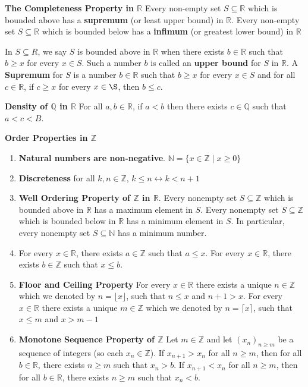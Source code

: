 

\begin{thm}\textbf{The Completeness Property in $\mathbb{R}$}
Every non-empty set $S\subseteq \mathbb{R}$ which is bounded above has a \textbf{supremum} (or least upper bound) in $\mathbb{R}$. Every non-empty set $S\subseteq \mathbb{R}$ which is bounded below has a \textbf{infimum} (or greatest lower bound) in $\mathbb{R}$

In $S \subseteq R$, we say $S$ is bounded above in $\mathbb{R}$ when there exists $b\in \mathbb{R}$ such that $b\geq x$ for every $x\in S$. Such a number $b$ is called an \textbf{upper bound} for $S$ in $\mathbb{R}$. A \textbf{Supremum} for $S$ is a number $b\in \mathbb{R}$ such that $b\geq x$ for every $x\in S$ and for all $c\in \mathbb{R}$, if $c\geq x$ for every $x\in \S$, then $b\leq c$.
\end{thm}

\begin{thm}
\textbf{Density of $\mathbb{Q}$ in $\mathbb{R}$} For all $a,b\in\mathbb{R}$, if $a<b$ then there exists $c\in \mathbb{Q}$ such that $a<c<B$.
\end{thm}

\begin{thm}\textbf{Order Properties in $\mathbb{Z}$}
\begin{enumerate}
    \item \textbf{Natural numbers are non-negative}. $\mathbb{N} = \{x\in \mathbb{Z} \mid x\geq 0\}$
    \item \textbf{Discreteness} for all $k,n\in \mathbb{Z}$, $k\leq n \leftrightarrow k<n+1$
    \item \textbf{Well Ordering Property of $\mathbb{Z}$ in $\mathbb{R}$}. Every nonempty set $S\subseteq \mathbb{Z}$ which is bounded above in $\mathbb{R}$ has a maximum element in $S$. Every nonempty set $S\subseteq \mathbb{Z}$ which is bounded below in $\mathbb{R}$ has a minimum element in $S$. In particular, every nonempty set $S\subseteq \mathbb{N}$ has a minimum number.
    \item For every $x\in \mathbb{R}$, there exists $a\in \mathbb{Z}$ such that $a\leq x$. For every $x\in \mathbb{R}$, there exists $b\in \mathbb{Z}$ such that $x\leq b$.
    \item \textbf{Floor and Ceiling Property} For every $x\in\mathbb{R}$ there exists a unique $n\in\mathbb{Z}$ which we denoted by $n=\lfloor x\rfloor$, such that $n\leq x$ and $n+1 >x$. For every $x\in\mathbb{R}$ there exists a unique $m\in\mathbb{Z}$ which we denoted by $n=\lceil x\rceil$, such that $x\leq m$ and $x > m-1$
    \item \textbf{Monotone Sequence Property of $\mathbb{Z}$} Let $m\in\mathbb{Z}$ and let $(x_n)_{n\geq m}$ be a sequence of integers (so each $x_n\in\mathbb{Z}$). If $x_{n+1} > x_n$ for all $n\geq m$, then for all $b\in \mathbb{R}$, there exists $n\geq m$ such that $x_n > b$. If $x_{n+1} < x_n$ for all $n\geq m$, then for all $b\in \mathbb{R}$, there exists $n\geq m$ such that $x_n < b$.
\end{enumerate}
\end{thm}

